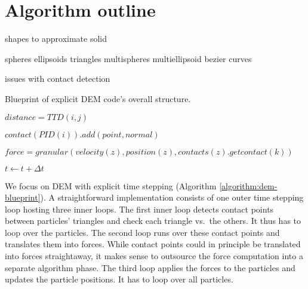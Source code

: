 \section{Algorithm outline}
\label{section:algorithm}
 
 
shapes to approximate solid

spheres
ellipsoids
triangles
multispheres
multiellipsoid
bezier curves


issues with contact detection


\begin{algorithm}
 
   Blueprint of explicit DEM code's overall structure.
 
 \label{algorithm:dem-blueprint}
 \begin{algorithmic}[1]
   

				
			\State $distance = TTD(i,j)$
				

				\State $contact(PID(i)).add(point, normal)$

			\EndIf
			
		\EndFor
			
	\EndFor




			\State $force = granular(velocity(z), position(z), contacts(z).getcontact(k))$

		\EndFor
	
	\EndFor    
    
     \State $t \gets t + \Delta t$
   \EndFor   

 \end{algorithmic}
\end{algorithm} 


We focus on DEM with explicit time stepping (Algorithm \ref{algorithm:dem-blueprint}). 
A straightforward implementation consists of one outer time stepping loop
hosting three inner loops. 
The first inner loop detects contact points between particles' triangles and
check each triangle vs.~the others.
It thus has to loop over the particles.
The second loop runs over these contact points and translates them into forces.
While contact points could in principle be translated into forces straightaway,
it makes sense to outsource the force computation into a separate algorithm
phase.
The third loop applies the forces to the particles and updates the particle
positions.
It has to loop over all particles.


